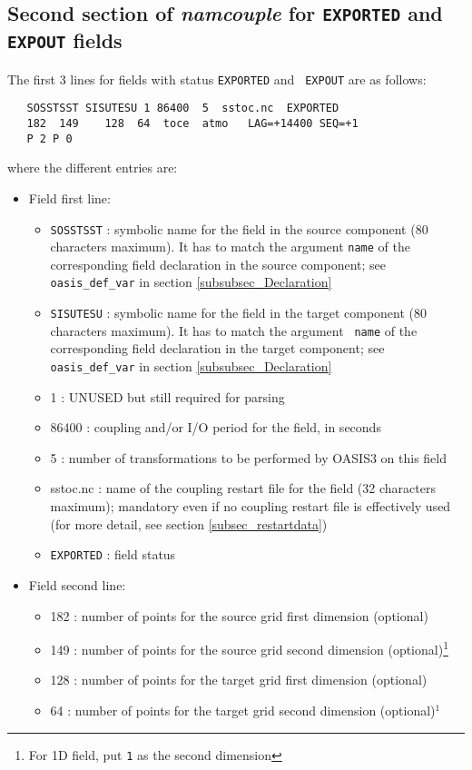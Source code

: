 \subsection{Second section of {\it namcouple} for {\tt EXPORTED} and
  {\tt EXPOUT} fields}
\label{subsubsec_secondEXPORTED}

The first 3 lines for fields with status {\tt EXPORTED} and {\tt
  EXPOUT} are as follows:
  \begin{verbatim}
   SOSSTSST SISUTESU 1 86400  5  sstoc.nc  EXPORTED
   182  149    128  64  toce  atmo   LAG=+14400 SEQ=+1
   P 2 P 0 
\end{verbatim}
where the different entries are:
\begin{itemize}
\item Field first line:
  \begin{itemize}

  \item {\tt SOSSTSST} : symbolic name for the field in the source
    component (80 characters maximum). It has to match the argument {\tt name}
    of the corresponding field declaration in the source component; see
    {\tt oasis\_def\_var} in section \ref{subsubsec_Declaration}
  \item {\tt SISUTESU} : symbolic name for the field in the target
    component (80 characters maximum).  It has to match the argument {\tt
      name} of the corresponding field declaration in the target
    component; see {\tt oasis\_def\_var} in section
    \ref{subsubsec_Declaration}
  \item 1 : UNUSED but still required for parsing
  \item 86400 : coupling and/or I/O period for the field, in seconds
  \item 5 : number of transformations to be performed by OASIS3 on
    this field
  \item sstoc.nc : name of the coupling restart file for the field
    (32 characters maximum); mandatory even if no coupling restart file is
    effectively used (for more detail, see section
    \ref{subsec_restartdata})
  \item {\tt EXPORTED} : field status
  \end{itemize}
\item Field second line:
  \begin{itemize}
  \item 182 : number of points for the source grid first dimension
    (optional)
  \item 149 : number of points for the source grid second dimension
    (optional)\footnote{For 1D field, put {\tt 1} as the second dimension}
  \item 128 : number of points for the target grid first dimension
    (optional)
  \item 64 : number of points for the target grid second dimension
    (optional)$^{1}$


\end{itemize}
\end{itemize}
